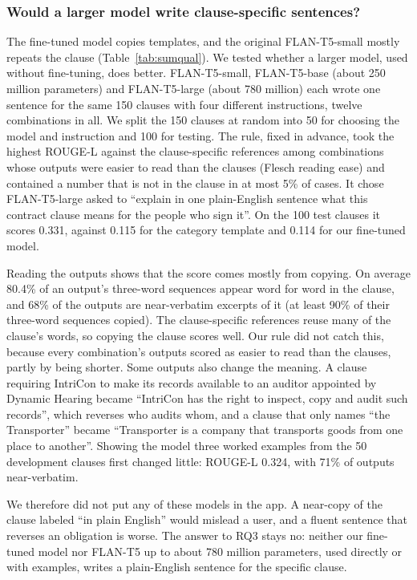 \subsubsection{Would a larger model write clause-specific sentences?}
The fine-tuned model copies templates, and the original FLAN-T5-small mostly repeats the clause (Table~\ref{tab:sumqual}). We tested whether a larger model, used without fine-tuning, does better. FLAN-T5-small, FLAN-T5-base (about 250 million parameters) and FLAN-T5-large (about 780 million) each wrote one sentence for the same 150 clauses with four different instructions, twelve combinations in all. We split the 150 clauses at random into 50 for choosing the model and instruction and 100 for testing. The rule, fixed in advance, took the highest ROUGE-L against the clause-specific references among combinations whose outputs were easier to read than the clauses (Flesch reading ease) and contained a number that is not in the clause in at most 5\% of cases. It chose FLAN-T5-large asked to ``explain in one plain-English sentence what this contract clause means for the people who sign it''. On the 100 test clauses it scores 0.331, against 0.115 for the category template and 0.114 for our fine-tuned model.

Reading the outputs shows that the score comes mostly from copying. On average 80.4\% of an output's three-word sequences appear word for word in the clause, and 68\% of the outputs are near-verbatim excerpts of it (at least 90\% of their three-word sequences copied). The clause-specific references reuse many of the clause's words, so copying the clause scores well. Our rule did not catch this, because every combination's outputs scored as easier to read than the clauses, partly by being shorter. Some outputs also change the meaning. A clause requiring IntriCon to make its records available to an auditor appointed by Dynamic Hearing became ``IntriCon has the right to inspect, copy and audit such records'', which reverses who audits whom, and a clause that only names ``the Transporter'' became ``Transporter is a company that transports goods from one place to another''. Showing the model three worked examples from the 50 development clauses first changed little: ROUGE-L 0.324, with 71\% of outputs near-verbatim.

We therefore did not put any of these models in the app. A near-copy of the clause labeled ``in plain English'' would mislead a user, and a fluent sentence that reverses an obligation is worse. The answer to RQ3 stays no: neither our fine-tuned model nor FLAN-T5 up to about 780 million parameters, used directly or with examples, writes a plain-English sentence for the specific clause.

